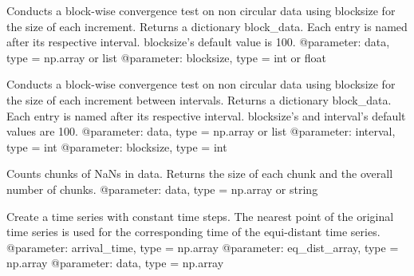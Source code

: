 \documentclass[letterpaper,10pt,english]{sphinxmanual}
\begin{document}

\begin{fulllineitems}
\label{\detokenize{index:windtunnel.convergence_test_1}}
Conducts a block-wise convergence test on non circular data using 
blocksize for the size of each increment. Returns a dictionary block\_data.
Each entry is named after its respective interval. blocksize’s default 
value is 100.
@parameter: data, type = np.array or list
@parameter: blocksize, type = int or float

\end{fulllineitems}


\begin{fulllineitems}
\label{\detokenize{index:windtunnel.convergence_test_2}}
Conducts a block-wise convergence test on non circular data using 
blocksize for the size of each increment between intervals. Returns a 
dictionary block\_data. Each entry is named after its respective interval.
blocksize’s and interval’s default values are 100.
@parameter: data, type = np.array or list
@parameter: interval, type = int
@parameter: blocksize, type = int

\end{fulllineitems}


\begin{fulllineitems}
\label{\detokenize{index:windtunnel.count_nan_chunks}}
Counts chunks of NaNs in data. Returns the size of each chunk and
the overall number of chunks.
@parameter: data, type = np.array or string

\end{fulllineitems}


\begin{fulllineitems}
\label{\detokenize{index:windtunnel.equ_dist_ts}}
Create a time series with constant time steps. The nearest point of the 
original time series is used for the corresponding time of the equi-distant
time series.
@parameter: arrival\_time, type = np.array
@parameter: eq\_dist\_array, type = np.array
@parameter: data, type = np.array

\end{fulllineitems}
\end{document}
